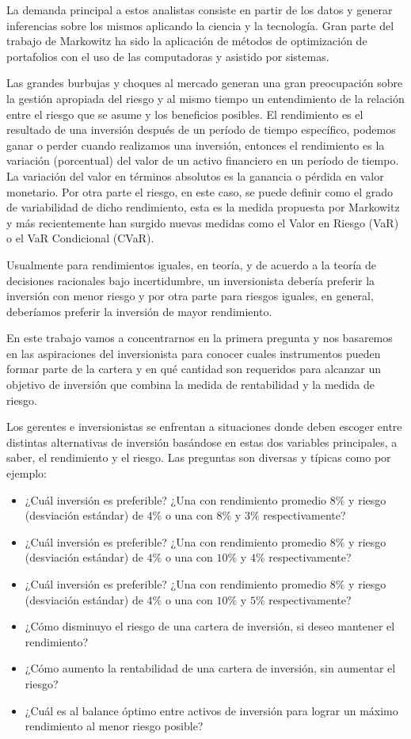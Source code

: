 \documentclass[
  12pt,
]{krantz}
\begin{document}
La demanda principal a estos analistas consiste en partir de los datos y generar inferencias sobre los mismos aplicando la ciencia y la tecnología. Gran parte del trabajo de Markowitz ha sido la aplicación de métodos de optimización de portafolios con el uso de las computadoras y asistido por sistemas.

Las grandes burbujas y choques al mercado generan una gran preocupación sobre la gestión apropiada del riesgo y al mismo tiempo un entendimiento de la relación entre el riesgo que se asume y los beneficios posibles. El rendimiento es el resultado de una inversión después de un período de tiempo específico, podemos ganar o perder cuando realizamos una inversión, entonces el rendimiento es la variación (porcentual) del valor de un activo financiero en un período de tiempo. La variación del valor en términos absolutos es la ganancia o pérdida en valor monetario. Por otra parte el riesgo, en este caso, se puede definir como el grado de variabilidad de dicho rendimiento, esta es la medida propuesta por Markowitz y más recientemente han surgido nuevas medidas como el Valor en Riesgo (VaR) o el VaR Condicional (CVaR).

Usualmente para rendimientos iguales, en teoría, y de acuerdo a la teoría de decisiones racionales bajo incertidumbre, un inversionista debería preferir la inversión con menor riesgo y por otra parte para riesgos iguales, en general, deberíamos preferir la inversión de mayor rendimiento.

En este trabajo vamos a concentrarnos en la primera pregunta y nos basaremos en las aspiraciones del inversionista para conocer cuales instrumentos pueden formar parte de la cartera y en qué cantidad son requeridos para alcanzar un objetivo de inversión que combina la medida de rentabilidad y la medida de riesgo.

Los gerentes e inversionistas se enfrentan a situaciones donde deben escoger entre distintas alternativas de inversión basándose en estas dos variables principales, a saber, el rendimiento y el riesgo. Las preguntas son diversas y típicas como por ejemplo:

\begin{itemize}
\item ¿Cuál inversión es preferible? ¿Una con rendimiento promedio $8\%$ y riesgo (desviación estándar) de $4\%$ o una con $8\%$ y $3\%$ respectivamente?
\item ¿Cuál inversión es preferible? ¿Una con rendimiento promedio $8\%$ y riesgo (desviación estándar) de $4\%$ o una con $10\%$ y $4\%$ respectivamente?
\item ¿Cuál inversión es preferible? ¿Una con rendimiento promedio $8\%$ y riesgo (desviación estándar) de $4\%$ o una con $10\%$ y $5\%$ respectivamente?
\item ¿Cómo disminuyo el riesgo de una cartera de inversión, si deseo mantener el rendimiento?
\item ¿Cómo aumento la rentabilidad de una cartera de inversión, sin aumentar el riesgo?
\item ¿Cuál es al balance óptimo entre activos de inversión para lograr un máximo rendimiento al menor riesgo posible?
\end{itemize}
\end{document}
